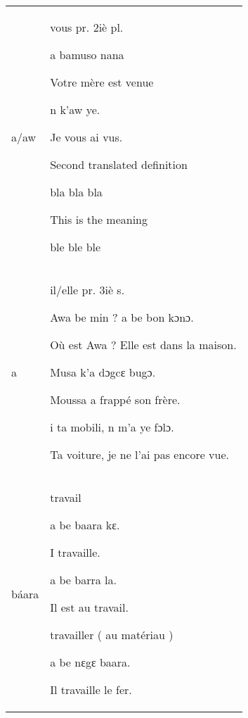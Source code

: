 \documentclass[a4paper,12pt]{article}
\begin{document}
\noindent
\begin{tabularx}{\textwidth}{@{} P{5cm} X @{}}
		a/aw &
\begin{definition}
\item vous pr. 2iè pl. 
  \begin{examples}
  \item a bamuso nana

		Votre mère est venue
  \item n k'aw ye.

  Je vous ai vus.
  \end{examples} 
\item Second translated definition 
  \begin{examples}
  \item bla bla bla

		This is the meaning
  \item ble ble ble 
  \end{examples}
\end{definition} 
\\
a &
\begin{definition}
\item il/elle pr. 3iè s.
	\begin{examples}
	\item Awa be min ? a be bon kɔnɔ.

		Où est Awa ? Elle est dans la maison. 
	\item Musa k'a dɔgcɛ bugɔ.

		Moussa a frappé son frère.
	\item i ta mobili, n m'a ye fɔlɔ.

		Ta voiture, je ne l'ai pas encore vue.  
	\end{examples}
\end{definition}
\\
báara &
\begin{definition}
\item travail
	\begin{examples}
	\item a be baara kɛ.

		I travaille.
	\item a be barra la.

		Il est au travail.
	\end{examples}
  \end{definition}
	\begin{definition}
	\item travailler ( au matériau )
		\begin{examples}
		\item a be nɛgɛ baara.

			Il travaille le fer.
		\end{examples}	
	\end{definition}
\end{tabularx}
\end{document}
